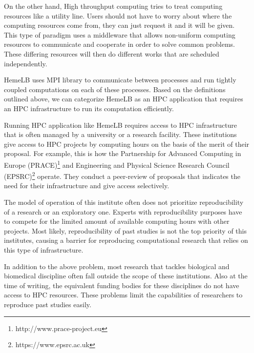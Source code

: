 On the other hand, High throughput computing tries to treat computing resources like a utility line. Users should not have to worry about where the computing resources come from, they can just request it and it will be given. This type of paradigm uses a middleware that allows non-uniform computing resources to communicate and cooperate in order to solve common problems\citep{Micro31:online}. These differing resources will then do different works that are scheduled independently. 

HemeLB uses MPI library to communicate between processes and run tightly coupled computations on each of these processes. Based on the definitions outlined above, we can categorize HemeLB as an HPC application that requires an HPC infrastructure to run its computation efficiently. 

Running HPC application like HemeLB requires access to HPC infrastructure that is often managed by a university or a research facility. These institutions give access to HPC projects by computing hours on the basis of the merit of their proposal. For example, this is how the Partnership for Advanced Computing in Europe (PRACE)\footnote{http://www.prace-project.eu} and Engineering and Physical Science Research Council (EPSRC)\footnote{https://www.epsrc.ac.uk} operate. They conduct a peer-review of proposals that indicates the need for their infrastructure and give access selectively.

The model of operation of this institute often does not prioritize reproducibility of a research or an exploratory one. Experts with reproducibility purposes have to compete for the limited amount of available computing hours with other projects. Most likely, reproducibility of past studies is not the top priority of this institutes, causing a barrier for reproducing computational research that relies on this type of infrastructure.


In addition to the above problem, most research that tackles biological and biomedical discipline often fall outside the scope of these institutions. Also at the time of writing, the equivalent funding bodies for these disciplines do not have access to HPC resources. These problems limit the capabilities of researchers to reproduce past studies easily. 


